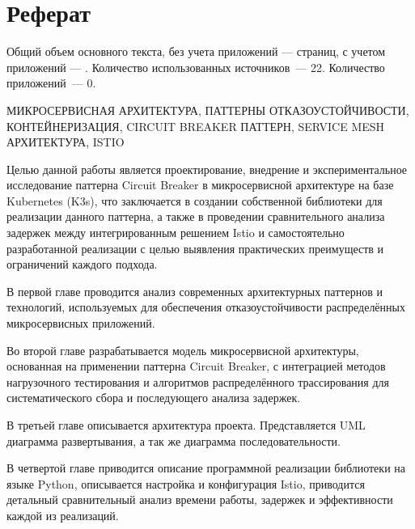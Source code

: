 \chapter*{Реферат}
\thispagestyle{plain}
Общий объем основного текста, без учета приложений ---
\pageref{end_of_main_text} страниц, с учетом приложений ---
\pageref{end_of_main_text}. Количество использованных источников~--- 22.
Количество приложений~--- 0.

\noindent \uppercase{микросервисная архитектура, паттерны отказоустойчивости, контейнеризация, circuit breaker паттерн, service mesh архитектура, Istio}

Целью данной работы является проектирование, внедрение и экспериментальное исследование паттерна Circuit Breaker в микросервисной архитектуре на базе Kubernetes (K3s), что заключается в создании собственной библиотеки для реализации данного паттерна, а также в проведении сравнительного анализа задержек между интегрированным решением Istio и самостоятельно разработанной реализации с целью выявления практических преимуществ и ограничений каждого подхода.

В первой главе проводится анализ современных архитектурных паттернов и технологий, используемых для обеспечения отказоустойчивости распределённых микросервисных приложений.

Во второй главе разрабатывается модель микросервисной архитектуры, основанная на применении паттерна Circuit Breaker, с интеграцией методов нагрузочного тестирования и алгоритмов распределённого трассирования для систематического сбора и последующего анализа задержек.

В третьей главе описывается архитектура проекта. Представляется UML диаграмма развертывания, а так же диаграмма последовательности.

В четвертой главе приводится описание программной реализации библиотеки на языке Python, описывается настройка и конфигурация Istio, приводится детальный сравнительный анализ времени работы, задержек и эффективности каждой из реализаций.




